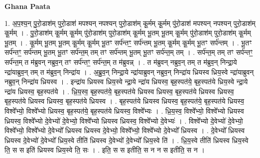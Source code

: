 \documentclass[17pt]{extarticle}
\begin{document}
\textbf{Ghana Paata } \newline

1. अ॒प॒श्य॒न् पु॒रो॒डाश॑म् पुरो॒डाश॑ मपश्यन् नपश्यन् पुरो॒डाश॑म् कू॒र्मम् कू॒र्मम् पु॑रो॒डाश॑ मपश्यन् नपश्यन् पुरो॒डाश॑म् कू॒र्मम् । . पु॒रो॒डाश॑म् कू॒र्मम् कू॒र्मम् पु॑रो॒डाश॑म् पुरो॒डाश॑म् कू॒र्मम् भू॒तम् भू॒तम् कू॒र्मम् पु॑रो॒डाश॑म् पुरो॒डाश॑म् कू॒र्मम् भू॒तम् । . कू॒र्मम् भू॒तम् भू॒तम् कू॒र्मम् कू॒र्मम् भू॒तꣳ सर्प॑न्तꣳ॒॒ सर्प॑न्तम् भू॒तम् कू॒र्मम् कू॒र्मम् भू॒तꣳ सर्प॑न्तम् । . भू॒तꣳ सर्प॑न्तꣳ॒॒ सर्प॑न्तम् भू॒तम् भू॒तꣳ सर्प॑न्त॒म् तम् तꣳ सर्प॑न्तम् भू॒तम् भू॒तꣳ सर्प॑न्त॒म् तम् । . सर्प॑न्त॒म् तम् तꣳ सर्प॑न्तꣳ॒॒ सर्प॑न्त॒म् त म॑ब्रुवन् नब्रुव॒न् तꣳ सर्प॑न्तꣳ॒॒ सर्प॑न्त॒म् त म॑ब्रुवन्न् । . त म॑ब्रुवन् नब्रुव॒न् तम् त म॑ब्रुव॒न् निन्द्रा॒ये न्द्रा॑याब्रुव॒न् तम् त म॑ब्रुव॒न् निन्द्रा॑य । . अ॒ब्रु॒व॒न् निन्द्रा॒ये न्द्रा॑याब्रुवन् नब्रुव॒न् निन्द्रा॑य ध्रियस्व ध्रिय॒स्वे न्द्रा॑याब्रुवन् नब्रुव॒न् निन्द्रा॑य ध्रियस्व । . इन्द्रा॑य ध्रियस्व ध्रिय॒स्वे न्द्रा॒ये न्द्रा॑य ध्रियस्व॒ बृह॒स्पत॑ये॒ बृह॒स्पत॑ये ध्रिय॒स्वे न्द्रा॒ये न्द्रा॑य ध्रियस्व॒ बृह॒स्पत॑ये । . ध्रि॒य॒स्व॒ बृह॒स्पत॑ये॒ बृह॒स्पत॑ये ध्रियस्व ध्रियस्व॒ बृह॒स्पत॑ये ध्रियस्व ध्रियस्व॒ बृह॒स्पत॑ये ध्रियस्व ध्रियस्व॒ बृह॒स्पत॑ये ध्रियस्व । . बृह॒स्पत॑ये ध्रियस्व ध्रियस्व॒ बृह॒स्पत॑ये॒ बृह॒स्पत॑ये ध्रियस्व॒ विश्वे᳚भ्यो॒ विश्वे᳚भ्यो ध्रियस्व॒ बृह॒स्पत॑ये॒ बृह॒स्पत॑ये ध्रियस्व॒ विश्वे᳚भ्यः । . ध्रि॒य॒स्व॒ विश्वे᳚भ्यो॒ विश्वे᳚भ्यो ध्रियस्व ध्रियस्व॒ विश्वे᳚भ्यो दे॒वेभ्यो॑ दे॒वेभ्यो॒ विश्वे᳚भ्यो ध्रियस्व ध्रियस्व॒ विश्वे᳚भ्यो दे॒वेभ्यः॑ । . विश्वे᳚भ्यो दे॒वेभ्यो॑ दे॒वेभ्यो॒ विश्वे᳚भ्यो॒ विश्वे᳚भ्यो दे॒वेभ्यो᳚ ध्रियस्व ध्रियस्व दे॒वेभ्यो॒ विश्वे᳚भ्यो॒ विश्वे᳚भ्यो दे॒वेभ्यो᳚ ध्रियस्व । . दे॒वेभ्यो᳚ ध्रियस्व ध्रियस्व दे॒वेभ्यो॑ दे॒वेभ्यो᳚ ध्रिय॒स्वे तीति॑ ध्रियस्व दे॒वेभ्यो॑ दे॒वेभ्यो᳚ ध्रिय॒स्वे ति॑ । . ध्रि॒य॒स्वे तीति॑ ध्रियस्व ध्रिय॒स्वे ति॒ स स इति॑ ध्रियस्व ध्रिय॒स्वे ति॒ सः । . इति॒ स स इतीति॒ स न न स इतीति॒ स न । \newline
\end{document}
